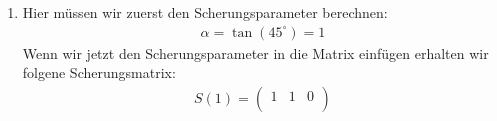 \documentclass[11pt]{article}
\begin{document}
\begin{enumerate}
\begin{align*}
\begin{pmatrix*}
                                         0 & 1 & 3 \\
                                         0 & 0 & 1
                                       \end{pmatrix*} \cdot \begin{pmatrix*}
                                                              0,5 & \frac{\sqrt{3}}{2} & 0 \\
                                                              -\frac{\sqrt{3}}{2} & 0,5 & 0 \\
                                                              0 & 0 & 1
                                                            \end{pmatrix*} & = \begin{pmatrix*}
                                                                                 0,5 & \frac{\sqrt{3}}{2} & 3 \\
                                                                                 -\frac{\sqrt{3}}{2} & 0,5 & 3 \\
                                                                                 0 & 0 & 1
                                                                               \end{pmatrix*} \\
                                                        & \approx \begin{pmatrix*}
                                                                    0,5 & 0,866 & 3 \\
                                                                    -0,866 & 0,5 & 3 \\
                                                                    0 & 0 & 1
                                                                  \end{pmatrix*}
        \end{align*}
  \item Hier müssen wir zuerst den Scherungsparameter berechnen:
        \begin{align*}
          \alpha = \tan(45^\circ) = 1
        \end{align*}
        Wenn wir jetzt den Scherungsparameter in die Matrix einfügen erhalten wir folgene Scherungsmatrix:
        \begin{align*}
          S(1) = \begin{pmatrix*}
                   1 & 1 & 0 \\

\end{pmatrix*}
\end{align*}
\end{enumerate}
\end{document}
